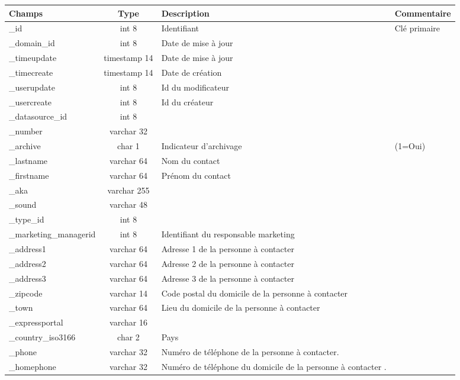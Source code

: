 \begin{tabular}{|p{3cm}|c|p{5.4cm}|p{2.6cm}|}
\hline
\textbf{Champs} & \textbf{Type} & \textbf{Description} & \textbf{Commentaire} \\
\hline
\_id & int 8 & Identifiant & Clé primaire \\
\hline
\_domain\_id & int 8 & Date de mise à jour & \\
\hline
\_timeupdate & timestamp 14 & Date de mise à jour & \\
\hline
\_timecreate & timestamp 14 & Date de création & \\
\hline
\_userupdate & int 8 & Id du modificateur & \\
\hline
\_usercreate & int 8 & Id du créateur & \\
\hline
\_datasource\_id & int 8 &  & \\
\hline
\_number & varchar 32 &  & \\
\hline
\_archive & char 1 & Indicateur d'archivage & (1=Oui) \\
\hline
\_lastname & varchar 64 & Nom du contact &  \\
\hline
\_firstname & varchar 64 & Prénom du contact &  \\
\hline
\_aka & varchar 255  &  & \\
\hline
\_sound & varchar 48  &  & \\
\hline
\_type\_id & int 8  &  & \\
\hline
\_marketing\_managerid & int 8  & Identifiant du responsable marketing  & \\
\hline
\_address1 & varchar 64 & Adresse 1 de la personne à contacter  & \\
\hline
\_address2 & varchar 64 & Adresse 2 de la personne à contacter & \\
\hline
\_address3 & varchar 64  & Adresse 3  de la personne à contacter & \\
\hline
\_zipcode & varchar 14 & Code postal du domicile de la personne à contacter  & \\
\hline
\_town & varchar 64 & Lieu du domicile de la personne à contacter  & \\
\hline
\_expressportal & varchar 16 &  & \\
\hline
\_country\_iso3166 & char 2 & Pays   & \\
\hline
\_phone & varchar 32 & Numéro de téléphone de la personne à contacter. & \\
\hline
\_homephone & varchar 32 & Numéro de téléphone du domicile de la personne à contacter . & \\

\end{tabular}
